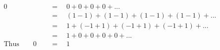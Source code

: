 \begin{align*}
0\quad&\,=\quad0+0+0+0+...\\
\,&\,=\quad(1-1)+(1-1)+(1-1)+(1-1)+...\\
\,&\,=\quad1+(-1+1)+(-1+1)+(-1+1)+...\\
\,&\,=\quad1+0+0+0+0+...\\
\mathrm{Thus}\qquad0\quad&\,=\quad1
\end{align*}
